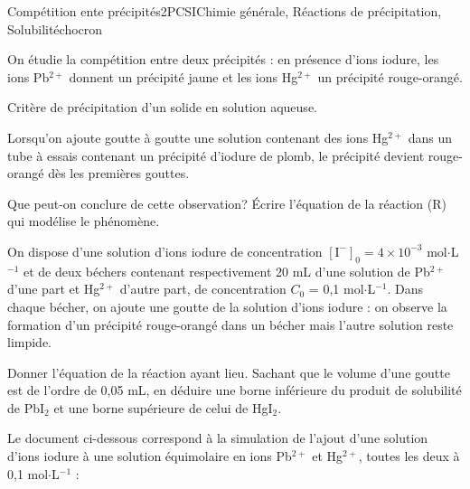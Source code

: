 \begin{exercise}{Compétition ente précipités}{2}{PCSI}{Chimie générale, Réactions de précipitation, Solubilité}{chocron}

On étudie la compétition entre deux précipités : en présence d'ions iodure, les ions Pb$^{2+}$ donnent un précipité jaune et les ions Hg$^{2+}$ un précipité rouge-orangé. 

\begin{questions}
\questioncours  Critère de précipitation d'un solide en solution aqueuse.

\begin{EnvUplevel}
Lorsqu'on ajoute goutte à goutte une solution contenant des ions Hg$^{2+}$ dans un tube à essais contenant un précipité d'iodure de plomb, le précipité devient rouge-orangé dès les premières gouttes.
\end{EnvUplevel}

\question Que peut-on conclure de cette observation? \'Ecrire l'équation de la réaction (R) qui modélise le phénomène.

\begin{EnvUplevel}
On dispose d'une solution d'ions iodure de concentration $\mathrm{[I^-]_0} = 4\times 10^{-3}$ mol$\cdot$L$^{-1}$ et de deux béchers contenant respectivement 20 mL d'une solution de Pb$^{2+}$ d'une part et Hg$^{2+}$ d'autre part, de concentration $C_0$ = 0,1 mol$\cdot$L$^{-1}$. 
Dans chaque bécher, on ajoute une goutte de la solution d'ions iodure : on observe la formation d'un précipité rouge-orangé dans un bécher mais l'autre solution reste limpide.
\end{EnvUplevel}

\question Donner l'équation de la réaction ayant lieu. Sachant que le volume d'une goutte est de l'ordre de 0,05 mL, en déduire une borne inférieure du produit de solubilité de PbI$_2$ et une borne supérieure de celui de HgI$_2$.

\begin{EnvUplevel}
Le document ci-dessous correspond à la simulation de l'ajout d'une solution d'ions iodure à une solution équimolaire en ions Pb$^{2+}$ et Hg$^{2+}$, toutes les deux à 0,1 mol$\cdot$L$^{-1}$ :


\end{EnvUplevel}
\end{questions}
\end{exercise}

